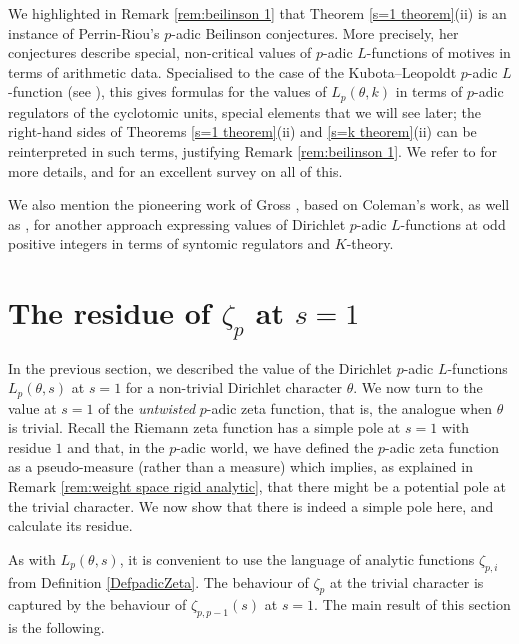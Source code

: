\documentclass[a4paper,10pt, english, reqno]{smfart}
\numberwithin{equation}{section}
\begin{document}
\begin{remark}\label{rem:gross etc}
We highlighted in Remark \ref{rem:beilinson 1} that Theorem \ref{s=1 theorem}(ii) is an instance of Perrin-Riou's $p$-adic Beilinson conjectures. More precisely, her conjectures describe special, non-critical values of $p$-adic $L$-functions of motives in terms of arithmetic data. Specialised to the case of the Kubota--Leopoldt $p$-adic $L$-function (see \cite[\S 4.3.3]{PerrinRiou}), this gives formulas for the values of $L_p(\theta, k)$ in terms of $p$-adic regulators of the cyclotomic units, special elements that we will see later; the right-hand sides of Theorems \ref{s=1 theorem}(ii) and \ref{s=k theorem}(ii) can be reinterpreted in such terms, justifying Remark \ref{rem:beilinson 1}. We refer to \cite{PR} for more details, and \cite{ColmezFonctL} for an excellent survey on all of this. 

We also mention the pioneering work of Gross \cite{GrossyntomicI}, based on Coleman's work, as well as \cite{MTsyntomic}, for another approach expressing values of Dirichlet $p$-adic $L$-functions at odd positive integers in terms of syntomic regulators and $K$-theory. 
\end{remark}







\section{The residue of $\zeta_p$ at $s = 1$}\label{sec:residue}

In the previous section, we described the value of the Dirichlet $p$-adic $L$-functions $L_p(\theta,s)$ at $s=1$ for a non-trivial Dirichlet character $\theta$.  We now turn to the value at $s=1$ of the \emph{untwisted} $p$-adic zeta function, that is, the analogue when $\theta$ is trivial. Recall the Riemann zeta function has a simple pole at $s = 1$ with residue $1$ and that, in the $p$-adic world, we have defined the $p$-adic zeta function as a pseudo-measure (rather than a measure) which implies, as explained in Remark \ref{rem:weight space rigid analytic}, that there might be a potential pole at the trivial character. We now show that there is indeed a simple pole here, and calculate its residue.

As with $L_p(\theta,s)$, it is convenient to use the language of analytic functions $\zeta_{p,i}$ from Definition \ref{DefpadicZeta}. The behaviour of $\zeta_p$ at the trivial character is captured by the behaviour of $\zeta_{p,p-1}(s)$ at $s=1$. The main result of this section is the following.
\end{document}
